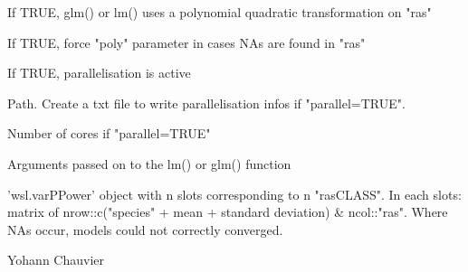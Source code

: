 \documentclass[a4paper]{book}
\begin{document}
\begin{Arguments}
\begin{ldescription}
\item[\code{poly}] If TRUE, glm() or lm() uses a polynomial quadratic transformation on "ras"

\item[\code{polyBRUT}] If TRUE, force "poly" parameter in cases NAs are found in "ras"

\item[\code{parallel}] If TRUE, parallelisation is active

\item[\code{parINFOS}] Path. Create a txt file to write parallelisation infos if "parallel=TRUE".

\item[\code{cores}] Number of cores if "parallel=TRUE"

\item[\code{...}] Arguments passed on to the lm() or glm() function
\end{ldescription}
\end{Arguments}
%
\begin{Value}
'wsl.varPPower' object with n slots corresponding to n "rasCLASS". In each
slots: matrix of nrow::c("species" + mean + standard deviation) \& ncol::"ras". Where NAs
occur, models could not correctly converged.
\end{Value}
%
\begin{Author}\relax
Yohann Chauvier
\end{Author}
%
\end{document}
